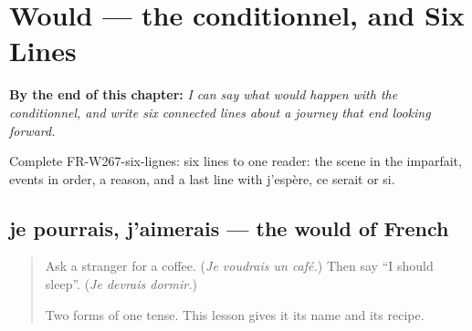 
\chapter{Would — the conditionnel, and Six Lines}
\label{ch:fr-would}

\begin{chapteropening}
\textbf{By the end of this chapter:} \emph{I can say what would happen with the conditionnel, and write six connected lines about a journey that end looking forward.}

Complete FR-W267-six-lignes: six lines to one reader: the scene in the imparfait, events in order, a reason, and a last line with j'espère, ce serait or si.
\end{chapteropening}

\section[je pourrais, j'aimerais, je devrais]{je pourrais, j'aimerais — the would of French}

\label{lesson:FR-C267-je-pourrais}



\begin{quote}
Ask a stranger for a coffee. (\emph{Je voudrais un café.}) Then say \textquotedblleft{}I should sleep\textquotedblright{}. (\emph{Je devrais dormir.})

Two forms of one tense. This lesson gives it its name and its recipe.
\end{quote}

